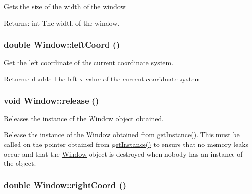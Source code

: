 Gets the size of the width of the window. 

\begin{Desc}
\item[Returns:]int The width of the window. \end{Desc}
\hypertarget{class_window_78ec7a0386c5be0e02fa9489223bc720}{
\subsubsection[{leftCoord}]{\setlength{\rightskip}{0pt plus 5cm}double Window::leftCoord ()}}
\label{class_window_78ec7a0386c5be0e02fa9489223bc720}


Get the left coordinate of the current coordinate system. 

\begin{Desc}
\item[Returns:]double The left x value of the current cooridnate system. \end{Desc}
\hypertarget{class_window_07c271fe1f0931b0c9ee269199937880}{
\subsubsection[{release}]{\setlength{\rightskip}{0pt plus 5cm}void Window::release ()}}
\label{class_window_07c271fe1f0931b0c9ee269199937880}


Releases the instance of the \hyperlink{class_window}{Window} object obtained. 

Release the instance of the \hyperlink{class_window}{Window} obtained from \hyperlink{class_window_9168e673f5c1866c4b1b41be425e88d6}{getInstance()}. This must be called on the pointer obtained from \hyperlink{class_window_9168e673f5c1866c4b1b41be425e88d6}{getInstance()} to ensure that no memory leaks occur and that the \hyperlink{class_window}{Window} object is destroyed when nobody has an instance of the object. \hypertarget{class_window_9f3a34c859cec1cdc6891e95a028266a}{
\subsubsection[{rightCoord}]{\setlength{\rightskip}{0pt plus 5cm}double Window::rightCoord ()}}
\label{class_window_9f3a34c859cec1cdc6891e95a028266a}


